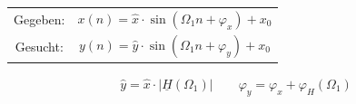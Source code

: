 \begin{tabular}{cc}
	Gegeben: & $x(n) = \hat{x} \cdot \sin(\Omega_1n+\varphi_x)+x_0$\\
	Gesucht: & $y(n) = \hat{y} \cdot \sin(\Omega_1n+\varphi_y)+x_0$
\end{tabular}
\begin{gather*}
\boxed{
\hat{y} = \hat{x} \cdot |\underline{H}(\Omega_1)|} \qquad
\boxed{
 \varphi_y = \varphi_x + \varphi_H(\Omega_1) } 
\end{gather*}




